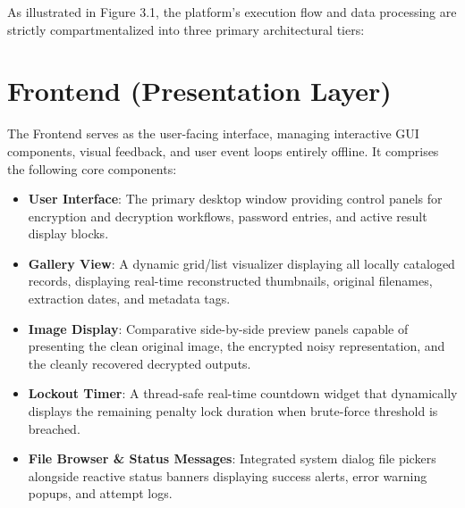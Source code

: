 \documentclass[12pt,a4paper]{report}
\begin{document}
\par
As illustrated in Figure 3.1, the platform's execution flow and data processing are strictly compartmentalized into three primary architectural tiers:

\section{Frontend (Presentation Layer)}
The Frontend serves as the user-facing interface, managing interactive GUI components, visual feedback, and user event loops entirely offline. It comprises the following core components:
\begin{itemize}
    \item \textbf{User Interface}: The primary desktop window providing control panels for encryption and decryption workflows, password entries, and active result display blocks.
    \item \textbf{Gallery View}: A dynamic grid/list visualizer displaying all locally cataloged records, displaying real-time reconstructed thumbnails, original filenames, extraction dates, and metadata tags.
    \item \textbf{Image Display}: Comparative side-by-side preview panels capable of presenting the clean original image, the encrypted noisy representation, and the cleanly recovered decrypted outputs.
    \item \textbf{Lockout Timer}: A thread-safe real-time countdown widget that dynamically displays the remaining penalty lock duration when brute-force threshold is breached.
    \item \textbf{File Browser \& Status Messages}: Integrated system dialog file pickers alongside reactive status banners displaying success alerts, error warning popups, and attempt logs.
\end{itemize}
\end{document}
